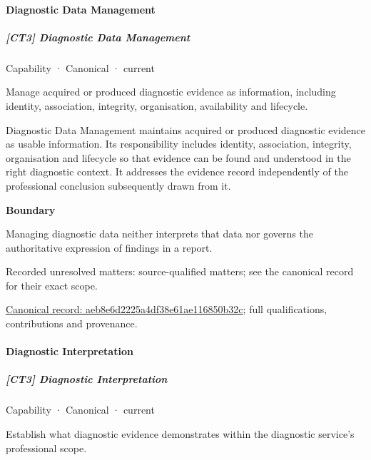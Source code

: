 \paragraph{Diagnostic Data Management}

\subparagraph{[CT3] Diagnostic Data Management}

\label{element:aeb8e6d2225a4df38e61ae116850b32c}
{\small Capability · Canonical · current}\par

Manage acquired or produced diagnostic evidence as information, including identity, association, integrity, organisation, availability and lifecycle.



Diagnostic Data Management maintains acquired or produced diagnostic evidence as usable information. Its responsibility includes identity, association, integrity, organisation and lifecycle so that evidence can be found and understood in the right diagnostic context. It addresses the evidence record independently of the professional conclusion subsequently drawn from it.



\textbf{Boundary}



Managing diagnostic data neither interprets that data nor governs the authoritative expression of findings in a report.


{\small Recorded unresolved matters: source-qualified matters; see the canonical record for their exact scope.}\par
{\footnotesize \href{../../../../continuum/strategy/capability/aeb8e6d2225a4df38e61ae116850b32c.md}{Canonical record: aeb8e6d2225a4df38e61ae116850b32c}; full qualifications, contributions and provenance.}\par
\paragraph{Diagnostic Interpretation}

\subparagraph{[CT3] Diagnostic Interpretation}

\label{element:82ad867109f1438eb1b0916ed9cd820f}
{\small Capability · Canonical · current}\par

Establish what diagnostic evidence demonstrates within the diagnostic service’s professional scope.



